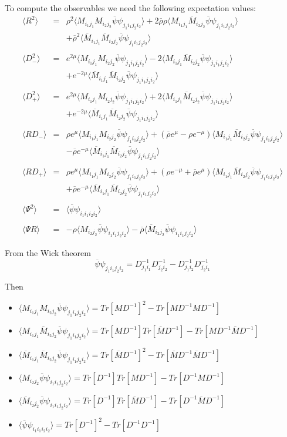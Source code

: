 \documentclass[a4paper,10pt]{report}
\newcommand{\ol}[1]{\overline{#1}}
\newcommand{\rrb}{\overline{\rho}}
\newcommand{\rr}{\rho}
\newcommand{\emu}{e^{\mu}}
\newcommand{\emmu}{e^{-\mu}}
\newcommand{\Mb}{\ol{M}}
\newcommand{\mv}[1]{\langle #1 \rangle}
\newcommand{\ppb}{\ol{\psi}\psi}
\newcommand{\D}{D^{-1}}
\begin{document}
To compute the observables we need the following expectation values:
\begin{eqnarray}
\mv{R^2} &=& \rr^2 \mv{M_{i_1j_1}M_{i_2j_2} \ppb_{j_1i_1j_2i_2}}
           + 2 \rrb \rr \mv{M_{i_1j_1}\Mb_{i_2j_2} \ppb_{j_1i_1j_2i_2}} \nonumber\\
          && + \rrb^2 \mv{\Mb_{i_1j_1}\Mb_{i_2j_2} \ppb_{j_1i_1j_2i_2}}  \\
\nonumber\\
\mv{D^2_-} &=& e^{2\mu} \mv{M_{i_1j_1}M_{i_2j_2} \ppb_{j_1i_1j_2i_2}}
           - 2 \mv{M_{i_1j_1}\Mb_{i_2j_2} \ppb_{j_1i_1j_2i_2}} \nonumber\\
          && + e^{-2\mu} \mv{\Mb_{i_1j_1}\Mb_{i_2j_2} \ppb_{j_1i_1j_2i_2}} \\
\nonumber\\
\mv{D^2_+} &=& e^{2\mu} \mv{M_{i_1j_1}M_{i_2j_2} \ppb_{j_1i_1j_2i_2}}
           + 2 \mv{M_{i_1j_1}\Mb_{i_2j_2} \ppb_{j_1i_1j_2i_2}} \nonumber\\
          && + e^{-2\mu} \mv{\Mb_{i_1j_1}\Mb_{i_2j_2} \ppb_{j_1i_1j_2i_2}} \\
\nonumber\\
\mv{RD_-} &=& \rr\emu \mv{M_{i_1j_1}M_{i_2j_2} \ppb_{j_1i_1j_2i_2}}
           + (\rrb \emu-\rr \emmu)\mv{M_{i_1j_1}\Mb_{i_2j_2}\ppb_{j_1i_1j_2i_2}} \nonumber\\
          && - \rrb\emmu \mv{\Mb_{i_1j_1}\Mb_{i_2j_2} \ppb_{j_1i_1j_2i_2}} \\
\nonumber\\
\mv{RD_+} &=& \rr\emu \mv{M_{i_1j_1}M_{i_2j_2} \ppb_{j_1i_1j_2i_2}}
          + (\rr \emmu + \rrb \emu)\mv{M_{i_1j_1}\Mb_{i_2j_2} \ppb_{j_1i_1j_2i_2}} \nonumber\\
          && + \rrb\emmu \mv{\Mb_{i_1j_1}\Mb_{i_2j_2} \ppb_{j_1i_1j_2i_2}} \\
\nonumber\\
\mv{\Psi^2} &=& \mv{\ppb_{i_1i_1i_2i_2}} \\
\nonumber\\
\mv{\Psi R} &=&  - \rr \mv{M_{i_2j_2}\ppb_{i_1i_1j_2i_2}} - \rrb \mv{\Mb_{i_2j_2} \ppb_{i_1i_1j_2i_2}}
\end{eqnarray}


\noindent From the Wick theorem
$$\ppb_{j_1i_1j_2i_2} = \D_{j_1i_1}\D_{j_2i_2} - \D_{j_1i_2}\D_{j_2i_1}$$

\noindent Then
\begin{itemize}
\item[] $\mv{M_{i_1j_1}M_{i_2j_2} \ppb_{j_1i_1j_2i_2}} = Tr[M\D]^2 - Tr[M\D M\D]$
\item[] $\mv{M_{i_1j_1}\Mb_{i_2j_2} \ppb_{j_1i_1j_2i_2}} = Tr[M\D]Tr[\Mb\D] - Tr[M\D \Mb\D]$
\item[] $\mv{\Mb_{i_1j_1}\Mb_{i_2j_2} \ppb_{j_1i_1j_2i_2}} = Tr[\Mb\D]^2 - Tr[\Mb\D \Mb\D]$

\item[] $\mv{M_{i_2j_2} \ppb_{i_1i_1j_2i_2}} = Tr[\D]Tr[M\D] - Tr[\D M \D]$
\item[] $\mv{\Mb_{i_2j_2} \ppb_{i_1i_1j_2i_2}} = Tr[\D]Tr[\Mb\D] - Tr[\D \Mb \D]$
\item[] $\mv{\ppb_{i_1i_1i_2i_2}} = Tr[\D]^2 - Tr[\D\D]$
\end{itemize}
\end{document}
